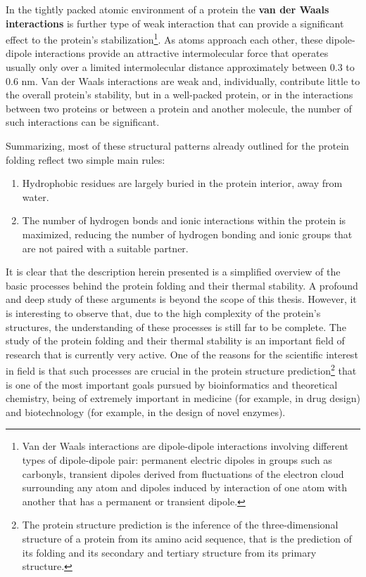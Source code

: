 In the tightly packed atomic environment of a protein the \textbf{van der Waals interactions} is further type of weak interaction that can provide a significant effect to the protein's stabilization\footnote{Van der Waals interactions are dipole-dipole interactions involving different types of dipole-dipole pair: permanent electric dipoles in groups such as carbonyls, transient dipoles derived from fluctuations of the electron cloud surrounding any atom and dipoles induced by interaction of one atom with another that has a permanent or transient dipole.}. As atoms approach each other, these dipole-dipole interactions provide an attractive intermolecular force that operates usually only over a limited intermolecular distance approximately between 0.3 to 0.6 nm. Van der Waals interactions are weak and, individually, contribute little to the overall protein's stability, but in a well-packed protein, or in the interactions between two proteins or between a protein and another molecule, the number of such interactions can be significant. 

Summarizing, most of these structural patterns already outlined for the protein folding reflect two simple main rules:
\begin{enumerate}
\item Hydrophobic residues are largely buried in the protein interior, away from water.
\item The number of hydrogen bonds and ionic interactions within the protein is maximized, reducing the number of hydrogen bonding and ionic groups that are not paired with a suitable partner.
\end{enumerate}

It is clear that the description herein presented is a simplified overview of the basic processes behind the protein folding and their thermal stability. A profound and deep study of these arguments is beyond the scope of this thesis. 
However, it is interesting to observe that, due to the high complexity of the protein's structures, the understanding of these processes is still far to be complete. The study of the protein folding and their thermal stability is an important field of research that is currently very active. One of the reasons for the scientific interest in field is that such processes are crucial in the protein structure prediction\footnote{The protein structure prediction is the inference of the three-dimensional structure of a protein from its amino acid sequence, that is the prediction of its folding and its secondary and tertiary structure from its primary structure.} that is one of the most important goals pursued by bioinformatics and theoretical chemistry, being of extremely important in medicine (for example, in drug design) and biotechnology (for example, in the design of novel enzymes). 

